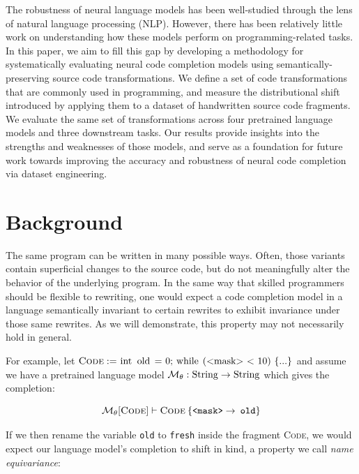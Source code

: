 \documentclass[usenames,dvipsnames]{article} %
\begin{document}
  The robustness of neural language models has been well-studied through the lens of natural language processing (NLP). However, there has been relatively little work on understanding how these models perform on programming-related tasks. In this paper, we aim to fill this gap by developing a methodology for systematically evaluating neural code completion models using semantically-preserving source code transformations. We define a set of code transformations that are commonly used in programming, and measure the distributional shift introduced by applying them to a dataset of handwritten source code fragments. We evaluate the same set of transformations across four pretrained language models and three downstream tasks. Our results provide insights into the strengths and weaknesses of those models, and serve as a foundation for future work towards improving the accuracy and robustness of neural code completion via dataset engineering.

  \section{Background}\label{sec:background}

  The same program can be written in many possible ways. Often, those variants contain superficial changes to the source code, but do not meaningfully alter the behavior of the underlying program. In the same way that skilled programmers should be flexible to rewriting, one would expect a code completion model in a language semantically invariant to certain rewrites to exhibit invariance under those same rewrites. As we will demonstrate, this property may not necessarily hold in general.

  For example, let $\textsc{Code} := \lstinline|int old = 0; while (<mask> < 10) {...}|$ and assume we have a pretrained language model $\mathcal{M}_\theta: \lstinline|String|\rightarrow\lstinline|String|$ which gives the completion:

  \begin{equation}
    \mathcal{M}_\theta[\textsc{Code}] \vdash \textsc{Code}\:\{\texttt{<mask>} \rightarrow \:\texttt{old}\}
  \end{equation}

  If we then rename the variable \texttt{old} to \texttt{fresh} inside the fragment \textsc{Code}, we would expect our language model's completion to shift in kind, a property we call \textit{name equivariance}:

  \begin{center}
    \begin{prooftree}
    \end{prooftree}
  \end{center}
\end{document}
